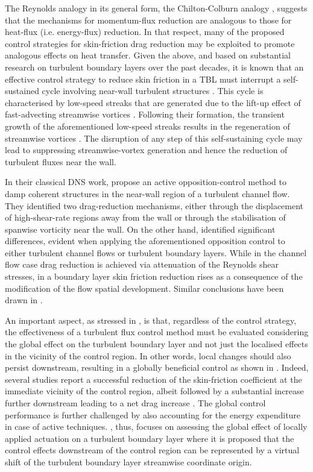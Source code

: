 The Reynolds analogy in its general form, the Chilton-Colburn analogy \citep{Chilton1934Jfactor, colburn1964analogy}, suggests that the mechanisms for momentum-flux reduction are analogous to those for heat-flux (i.e. energy-flux) reduction. In that respect, many of the proposed control strategies for skin-friction drag reduction may be exploited to promote analogous effects on heat transfer. Given the above, and based on substantial research on turbulent boundary layers over the past decades, it is known that an effective control strategy to reduce skin friction in a TBL must interrupt a self-sustained cycle involving near-wall turbulent structures \citep{hamilton1995,Jimenez1999,schoppa2002}. This cycle is characterised by low-speed streaks that are generated due to the lift-up effect of fast-advecting streamwise vortices \citep{Butler1993}. Following their formation, the transient growth of the aforementioned low-speed streaks results in the regeneration of streamwise vortices \citep{hamilton1995,schoppa2002}. The disruption of any step of this self-sustaining cycle may lead to suppressing streamwise-vortex generation and hence the reduction of turbulent fluxes near the wall.

In their classical DNS work, \citet{Choi1994} propose an active opposition-control method to damp coherent structures in the near-wall region of a turbulent channel flow. They identified two drag-reduction mechanisms, either through the displacement of high-shear-rate regions away from the wall or through the stabilisation of spanwise vorticity near the wall. On the other hand, \citet{Stroh2015} identified significant differences, evident when applying the aforementioned opposition control to either turbulent channel flows or turbulent boundary layers. While in the channel flow case drag reduction is achieved via attenuation of the Reynolds shear stresses, in a boundary layer skin friction reduction rises as a consequence of the modification of the flow spatial development. Similar conclusions have been drawn in \citet{Jimenez1999, Adrian2000, Iwamoto2002, Fukagata2002}.

An important aspect, as stressed in \citet{Spalart2011}, is that, regardless of the control strategy, the effectiveness of a turbulent flux control method must be evaluated considering the global effect on the turbulent boundary layer and not just the localised effects in the vicinity of the control region. In other words, local changes should also persist downstream, resulting in a globally beneficial control as shown in \citet{Yudhistira2011,Lardeau2013}. Indeed, several studies report a successful reduction of the skin-friction coefficient at the immediate vicinity of the control region, albeit followed by a substantial increase further downstream leading to a net drag increase \citep{Park1999, Kim2002}. The global control performance is further challenged by also accounting for the energy expenditure in case of active techniques. \citet{Stroh2016}, thus, focuses on assessing the global effect of locally applied actuation on a turbulent boundary layer where it is proposed that the control effects downstream of the control region can be represented by a virtual shift of the turbulent boundary layer streamwise coordinate origin.

